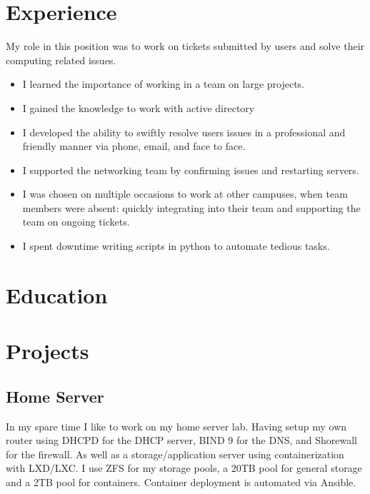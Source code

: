 \documentclass[a4paper]{cv}
\begin{document}
\begin{minipage}[t]{0.60\textwidth}
\section{Experience}
My role in this position was to work on tickets submitted by users and solve their computing related issues.
\begin{itemize}
    \item I learned the importance of working in a team on large projects.
    \item I gained the knowledge to work with active directory
    \item I developed the ability to swiftly resolve users issues in a professional and friendly manner via phone, email, and face to face.
    \item I supported the networking team by confirming issues and restarting servers.
    \item I was chosen on multiple occasions to work at other campuses, when team members were absent: quickly integrating into their team and supporting the team on ongoing tickets.
    \item I spent downtime writing scripts in python to automate tedious tasks.
\end{itemize}
\section{Education}
\sectionspace

\sectionspace

 
\section{Projects}
\subsection{Home Server}
In my spare time I like to work on my home server lab. Having setup my own router using DHCPD for the DHCP server, BIND 9 for the DNS, and Shorewall for the firewall. As well as a storage/application server using containerization with LXD/LXC. I use ZFS for my storage pools, a 20TB pool for general storage and a 2TB pool for containers. Container deployment is automated via Ansible.


\end{minipage}
\end{document}
